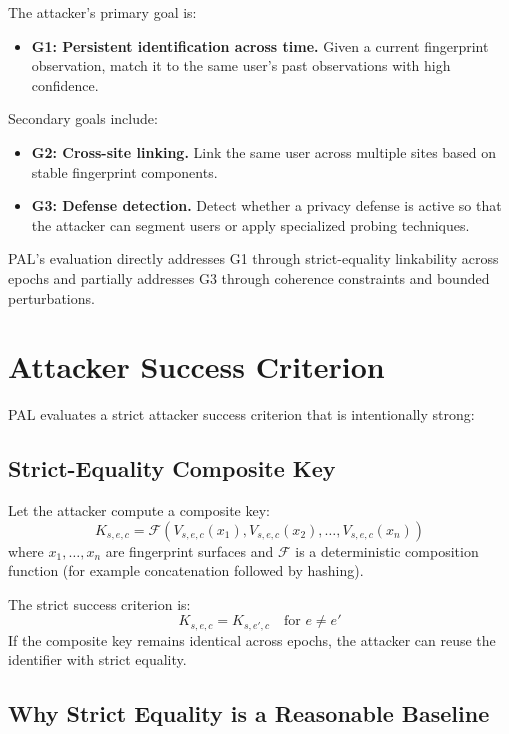 \documentclass[11pt]{report}
\begin{document}
The attacker’s primary goal is:

\begin{itemize}
    \item \textbf{G1: Persistent identification across time.} Given a current fingerprint observation, match it to the same user’s past observations with high confidence.
\end{itemize}

Secondary goals include:

\begin{itemize}
    \item \textbf{G2: Cross-site linking.} Link the same user across multiple sites based on stable fingerprint components.
    \item \textbf{G3: Defense detection.} Detect whether a privacy defense is active so that the attacker can segment users or apply specialized probing techniques.
\end{itemize}

PAL’s evaluation directly addresses G1 through strict-equality linkability across epochs and partially addresses G3 through coherence constraints and bounded perturbations.

\section{Attacker Success Criterion}

PAL evaluates a strict attacker success criterion that is intentionally strong:

\subsection{Strict-Equality Composite Key}

Let the attacker compute a composite key:
\[
K_{s,e,c} = \mathcal{F}\left(V_{s,e,c}(x_1), V_{s,e,c}(x_2), \dots, V_{s,e,c}(x_n)\right)
\]
where $x_1,\dots,x_n$ are fingerprint surfaces and $\mathcal{F}$ is a deterministic composition function (for example concatenation followed by hashing).

The strict success criterion is:
\[
K_{s,e,c} = K_{s,e',c}
\quad \text{for } e \neq e'
\]
If the composite key remains identical across epochs, the attacker can reuse the identifier with strict equality.

\subsection{Why Strict Equality is a Reasonable Baseline}
\end{document}
